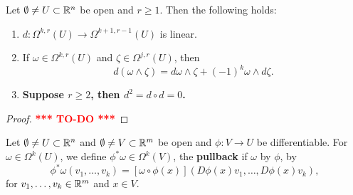 \documentclass[a4paper]{article}
\newcommand{\TODO}{\textcolor{red}{\textbf{*** TO-DO ***}}}
\begin{document}
\begin{thm}
  Let $\emptyset \neq U \subset \mathbb{R}^n$ be open and $r \geq 1$. Then the
  following holds:
  \begin{enumerate}
    \item $d : \Omega^{k, r}(U) \to \Omega^{k+1, r-1} (U)$
          is linear.
    \item If $\omega \in \Omega^{k, r}(U)$ and $\zeta \in \Omega^{j, r}
          (U)$, then
          \[
            d (\omega \wedge \zeta) = d \omega \wedge \zeta
            + (-1)^k \omega \wedge d \zeta.
          \]
    \item[\textbf{3.}]
          \textbf{Suppose $r \geq 2$, then $d^2 = d \circ d = 0$.}
  \end{enumerate}
\end{thm}

\begin{proof}
  \TODO
\end{proof}

\begin{defi}[pullback]
  Let $\emptyset \neq U \subset \mathbb{R}^n$ and $\emptyset \neq V
    \subset \mathbb{R}^m$ be open and $\phi : V \to U$ be differentiable.
  For $\omega \in \Omega^k(U)$, we define $\phi^* \omega \in
    \Omega^k(V)$, the \textbf{pullback} if $\omega$ by $\phi$,
  by
  \[
    \phi^* \omega (v_1, \dots, v_k) =
    [\omega \circ \phi(x)] (D \phi(x) v_1, \dots, D \phi(x) v_k),
  \]
  for $v_1, \dots, v_k \in \mathbb{R}^m$ and $x \in V$.
\end{defi}
\end{document}
